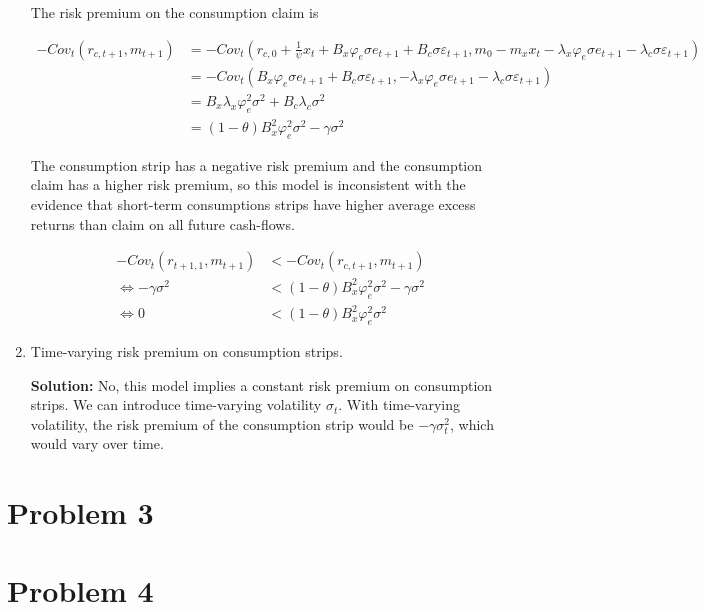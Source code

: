 \documentclass{article}
\begin{document}
\begin{enumerate}
The risk premium on the consumption claim is

\begin{align*}
-Cov_t(r_{c,t+1}, m_{t+1}) 
&= -Cov_t(r_{c,0} +  \frac{1}{\psi} x_t  + B_x \varphi_e\sigma e_{t+1} + B_c \sigma \varepsilon_{t+1}, m_0 - m_x x_t -\lambda_x \varphi_e \sigma e_{t+1} - \lambda_c \sigma \varepsilon_{t+1})\\
&= -Cov_t( B_x \varphi_e\sigma e_{t+1} + B_c \sigma \varepsilon_{t+1}, -\lambda_x \varphi_e \sigma e_{t+1} - \lambda_c \sigma \varepsilon_{t+1})\\
&= B_x\lambda_x \varphi_e^2 \sigma^2 + B_c \lambda_c \sigma^2\\
&= (1-\theta)B_x^2 \varphi_e^2\sigma^2 -\gamma \sigma^2
\end{align*}

The consumption strip has a negative risk premium and the consumption claim has a higher risk premium, so this model is inconsistent with the evidence that short-term consumptions strips have higher average excess returns than claim on all future cash-flows.

\begin{align*}
-Cov_t(r_{t+1, 1}, m_{t+1}) &< -Cov_t(r_{c,t+1}, m_{t+1}) \\
\iff
-\gamma \sigma^2 &< (1-\theta)B_x^2 \varphi_e^2\sigma^2 -\gamma \sigma^2\\
\iff
0 &< (1-\theta)B_x^2 \varphi_e^2\sigma^2
\end{align*}

\item Time-varying risk premium on consumption strips.

\bigskip

\textbf{Solution:} No, this model implies a constant risk premium on consumption strips.  We can introduce time-varying volatility $\sigma_t$. With time-varying volatility, the risk premium of the consumption strip would be $-\gamma \sigma_t^2$, which would vary over time.

\end{enumerate}

\pagebreak

\section{Problem 3}


\pagebreak

\section{Problem 4}
\end{document}
